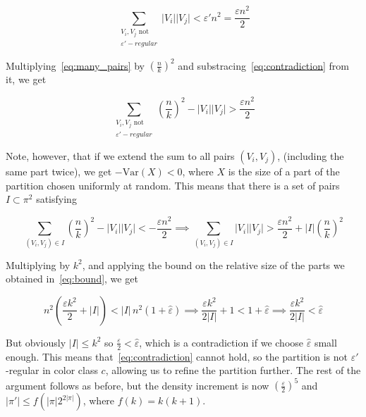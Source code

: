 \documentclass{amsart}
\theoremstyle{plain}
\theoremstyle{definition}
\begin{document}
    \begin{equation}\label{eq:contradiction}
        \sum_{\substack{V_i, V_j \text{ not } \\ \varepsilon'-regular}} \lvert V_i \rvert \lvert V_j \rvert < \varepsilon' n^2 = \frac{\varepsilon n^2}{2}
    \end{equation}

    Multiplying~\eqref{eq:many_pairs} by $\left(\frac{n}{k}\right)^2$ and substracing~\eqref{eq:contradiction} from it, we get

    \begin{equation}\label{eq:combined}
        \sum_{\substack{V_i, V_j \text{ not } \\ \varepsilon'-regular}} \left( \frac{n}{k} \right)^2 - \lvert V_i \rvert \lvert V_j \rvert > \frac{\varepsilon n^2}{2}
    \end{equation}

    Note, however, that if we extend the sum to all pairs $(V_i, V_j)$, (including the same part twice), we get $-\text{Var}(X) < 0$,
    where $X$ is the size of a part of the partition chosen uniformly at random.
    This means that there is a set of pairs $I \subset \pi^2$ satisfying

    \begin{equation*}\label{eq:others}
        \sum_{(V_i, V_j) \in I} \left( \frac{n}{k} \right)^2 - \lvert V_i \rvert \lvert V_j \rvert <  - \frac{\varepsilon n^2}{2}
        \implies \sum_{(V_i, V_j) \in I} \lvert V_i \rvert \lvert V_j \rvert > \frac{\varepsilon n^2}{2} + \lvert I \rvert \left( \frac{n}{k} \right)^2
    \end{equation*}

    Multiplying by $k^2$, and applying the bound on the relative size of the parts we obtained in~\eqref{eq:bound}, we get

    \begin{equation*}\label{eq:equation}
        n^2 \left( \frac{\varepsilon k^2}{2} + \lvert I \rvert \right) < \lvert I \rvert \, n^2 \left( 1 + \hat{\varepsilon} \right)
        \implies \frac{\varepsilon k^2}{2 \lvert I \rvert} + 1 < 1 + \hat{\varepsilon}
        \implies \frac{\varepsilon k^2}{2 \lvert I \rvert} < \hat{\varepsilon}
    \end{equation*}

    But obviously $\lvert I \rvert \leq k^2$ so $\frac{\varepsilon}{2} < \hat{\varepsilon}$, which is a contradiction
    if we choose $\hat{\varepsilon}$ small enough.
    This means that~\eqref{eq:contradiction} cannot hold,
    so the partition is not $\varepsilon'$-regular in color class $c$, allowing us to refine
    the partition further.
    The rest of the argument follows as before, but the density increment is now $(\frac{\varepsilon}{2})^5$
    and $\lvert \pi' \rvert \leq f\left( \lvert \pi \rvert 2^{2 \lvert \pi \rvert}\right)$,
    where $f(k) = k(k+1)$.
\end{document}
